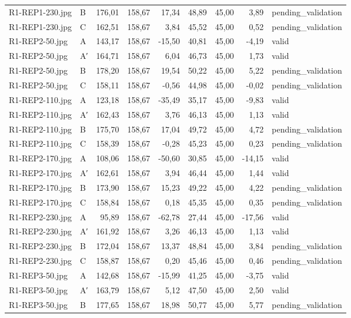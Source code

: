 \begin{scriptsize}
\begin{longtable}{@{}llrrrrrrl@{}}
R1-REP1-230.jpg & B & 176,01 & 158,67 & 17,34 & 48,89 & 45,00 & 3,89 & pending\_validation \\
R1-REP1-230.jpg & C & 162,51 & 158,67 & 3,84 & 45,52 & 45,00 & 0,52 & pending\_validation \\
R1-REP2-50.jpg & A & 143,17 & 158,67 & -15,50 & 40,81 & 45,00 & -4,19 & valid \\
R1-REP2-50.jpg & A′ & 164,71 & 158,67 & 6,04 & 46,73 & 45,00 & 1,73 & valid \\
R1-REP2-50.jpg & B & 178,20 & 158,67 & 19,54 & 50,22 & 45,00 & 5,22 & pending\_validation \\
R1-REP2-50.jpg & C & 158,11 & 158,67 & -0,56 & 44,98 & 45,00 & -0,02 & pending\_validation \\
R1-REP2-110.jpg & A & 123,18 & 158,67 & -35,49 & 35,17 & 45,00 & -9,83 & valid \\
R1-REP2-110.jpg & A′ & 162,43 & 158,67 & 3,76 & 46,13 & 45,00 & 1,13 & valid \\
R1-REP2-110.jpg & B & 175,70 & 158,67 & 17,04 & 49,72 & 45,00 & 4,72 & pending\_validation \\
R1-REP2-110.jpg & C & 158,39 & 158,67 & -0,28 & 45,23 & 45,00 & 0,23 & pending\_validation \\
R1-REP2-170.jpg & A & 108,06 & 158,67 & -50,60 & 30,85 & 45,00 & -14,15 & valid \\
R1-REP2-170.jpg & A′ & 162,61 & 158,67 & 3,94 & 46,44 & 45,00 & 1,44 & valid \\
R1-REP2-170.jpg & B & 173,90 & 158,67 & 15,23 & 49,22 & 45,00 & 4,22 & pending\_validation \\
R1-REP2-170.jpg & C & 158,84 & 158,67 & 0,18 & 45,35 & 45,00 & 0,35 & pending\_validation \\
R1-REP2-230.jpg & A & 95,89 & 158,67 & -62,78 & 27,44 & 45,00 & -17,56 & valid \\
R1-REP2-230.jpg & A′ & 161,92 & 158,67 & 3,26 & 46,13 & 45,00 & 1,13 & valid \\
R1-REP2-230.jpg & B & 172,04 & 158,67 & 13,37 & 48,84 & 45,00 & 3,84 & pending\_validation \\
R1-REP2-230.jpg & C & 158,87 & 158,67 & 0,20 & 45,46 & 45,00 & 0,46 & pending\_validation \\
R1-REP3-50.jpg & A & 142,68 & 158,67 & -15,99 & 41,25 & 45,00 & -3,75 & valid \\
R1-REP3-50.jpg & A′ & 163,79 & 158,67 & 5,12 & 47,50 & 45,00 & 2,50 & valid \\
R1-REP3-50.jpg & B & 177,65 & 158,67 & 18,98 & 50,77 & 45,00 & 5,77 & pending\_validation \\

\end{longtable}
\end{scriptsize}
